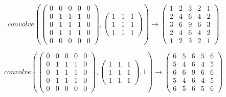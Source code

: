 \documentclass[12pt]{report}
\begin{document}
     \[
 convolve\left( \begin{pmatrix} 0 & 0 & 0 & 0 &
 0 \\ 0 & 1 & 1 & 1 & 0 \\ 0 & 1 & 1 & 1 & 0 \\ 0 & 1 & 1 & 1 & 0 \\ 0 & 0 & 0 & 0 & 0 \end{pmatrix},
\begin{pmatrix} 1 & 1 &
1 \\ 1 & 1 &
     1 \\ 1 & 1 &
          1 \end{pmatrix} \right) \to \begin{pmatrix} 1 & 2 & 3 & 2 &
1 \\ 2 & 4 & 6 & 4 & 2 \\ 3 & 6 & 9 & 6 & 3 \\ 2 & 4 & 6 & 4 & 2 \\ 1 & 2 & 3 & 2 & 1 \end{pmatrix}    \]

     \[
 convolve\left( \begin{pmatrix} 0 & 0 & 0 & 0 &
 0 \\ 0 & 1 & 1 & 1 & 0 \\ 0 & 1 & 1 & 1 & 0 \\ 0 & 1 & 1 & 1 & 0 \\ 0 & 0 & 0 & 0 & 0 \end{pmatrix},
\begin{pmatrix} 1 & 1 & 1 \\ 1 & 1 & 1 \\ 1 & 1 & 1 \end{pmatrix},
1 \right) \to \begin{pmatrix} 6 & 5 & 6 & 5 &
6 \\ 5 & 4 & 6 & 4 & 5 \\ 6 & 6 & 9 & 6 & 6 \\ 5 & 4 & 6 & 4 & 5 \\ 6 & 5 & 6 & 5 & 6 \end{pmatrix}
   \]
\end{document}
